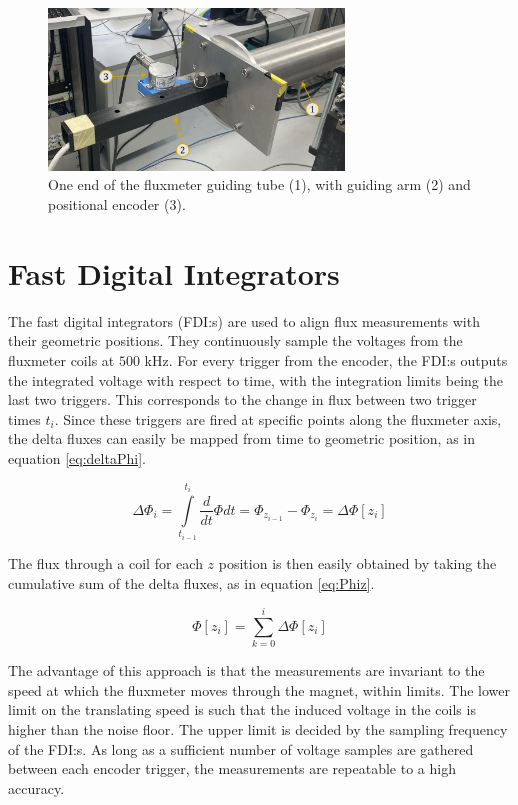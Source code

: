 \begin{figure}[h]
    \centering
    \includegraphics[width=0.7\textwidth]{figs/encoder}
    \caption{One end of the fluxmeter guiding tube (1), with guiding arm (2)
        and positional encoder (3).}
    \label{fig:encoderpic}
\end{figure}

\section{Fast Digital Integrators}
The fast digital integrators (FDI:s) are used to align flux measurements
with their geometric positions. They continuously sample the voltages
from the fluxmeter coils at $500$ kHz. For every trigger from the encoder,
the FDI:s outputs the integrated voltage with respect to time, with the
integration limits being the last two triggers. This
corresponds to the change in flux between two trigger times $t_i$. Since these
triggers are fired at specific points along the fluxmeter axis, the
delta fluxes can easily be mapped from time to geometric position, as in
equation \ref{eq:deltaPhi}.

\begin{equation}
    \Delta \Phi_i =
    \int \limits_{t_{i-1}}^{t_i} \frac{d}{dt}\Phi dt
    = \Phi_{z_{i-1}} - \Phi_{z_{i}} = \Delta \Phi[z_i]
    \label{eq:deltaPhi}
\end{equation}

The flux through a coil for each $z$ position is then easily obtained
by taking the cumulative sum of the delta fluxes, as in equation
\ref{eq:Phiz}.

\begin{equation}
    \Phi[z_i] = \sum \limits_{k=0}^i \Delta \Phi[z_i]
    \label{eq:Phiz}
\end{equation}

The advantage of this approach is that the measurements are invariant
to the speed at which the fluxmeter moves through the magnet, within limits.
The lower limit on the translating speed is such that the induced
voltage in the coils is higher than the noise floor.
The upper limit is decided by the sampling frequency of the FDI:s.
As long as a sufficient number of voltage samples are gathered between
each encoder trigger, the measurements are repeatable to a high accuracy.

